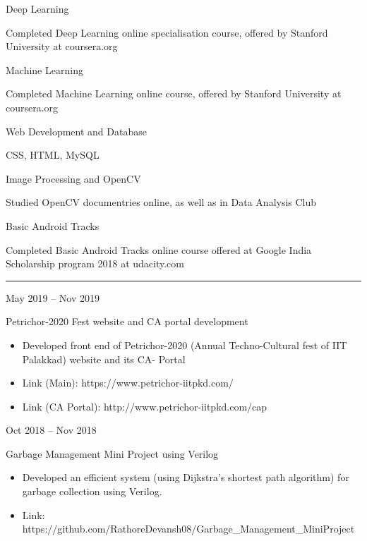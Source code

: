 \documentclass[a4paper,10pt]{article}
\newlength{\cvcolumngapwidth}
\newlength{\cvleftcolumnwidth}
\newlength{\cvrightcolumnwidth}
\newcommand{\cvsectionstyle}[1]{{\normalsize\cvsectionfont\textcolor{cvsectioncolor}{#1}}}
\newcommand{\cvtitlestyle}[1]{{\large\cvtitlefont\textcolor{cvtitlecolor}{#1}}}
\newcommand{\cvdurationstyle}[1]{{\small\cvdurationfont\textcolor{cvdurationcolor}{#1}}}
\newcommand{\cvheadingstyle}[1]{{\normalsize\cvheadingfont\textcolor{cvheadingcolor}{#1}}}
\newlength{\cvafteritemskipamount}
\newlength{\cvaftersectionskipamount}
\newlength{\cvbetweensectionandheadingextraskipamount}
\newlength{\cvaftertitleskipamount}
\newlength{\cvparskip}
\newcommand{\cvsection}[1]{
    \begin{minipage}[t]{\cvleftcolumnwidth}
        \raggedleft\cvsectionstyle{#1}
    \end{minipage}%
    \hspace{\cvcolumngapwidth}%
    \begin{minipage}[t]{\cvrightcolumnwidth}
        \textcolor{cvrulecolor}{\rule{\cvrightcolumnwidth}{0.3mm}}
    \end{minipage}

    \vspace{\cvaftersectionskipamount}
}
\newcommand{\cvitem}[2]{
    \begin{minipage}[t]{\cvleftcolumnwidth}
        \raggedleft #1
    \end{minipage}%
    \hspace{\cvcolumngapwidth}%
    \begin{minipage}[t]{\cvrightcolumnwidth}
        \setlength{\parskip}{\cvparskip} #2
    \end{minipage}

    \vspace{\cvafteritemskipamount}
}
\newcommand{\cvtitle}[1]{
    \cvtitlestyle{#1}

    \vspace{\cvaftertitleskipamount}
    \vspace{-\cvparskip}
}
\begin{document}
\cvitem{
    \cvheadingstyle{Deep Learning}
}{
   
    Completed Deep Learning online specialisation course, offered by Stanford University at coursera.org
    
}

\cvitem{
    \cvheadingstyle{Machine Learning}
}{
   
    Completed Machine Learning online course, offered by Stanford University at coursera.org
    
}

\cvitem{
    \cvheadingstyle{Web Development and Database}
}{
    
   CSS, HTML, MySQL
    
}

\cvitem{
    \cvheadingstyle{Image Processing and OpenCV}
}{
    
   Studied OpenCV documentries online, as well as in Data Analysis Club 
    
}

\cvitem{
    \cvheadingstyle{Basic Android Tracks}
}{
    
   Completed Basic Android Tracks online course offered at Google India Scholarship program 2018 at udacity.com
}

\cvsection{PROJECTS}

\vspace{\cvbetweensectionandheadingextraskipamount}

\cvitem{
    \cvdurationstyle{May 2019 -- Nov 2019}
}{
    \cvtitle{Petrichor-2020 Fest website and CA portal development  }

    \begin{itemize}[leftmargin=*]
        \item Developed front end of Petrichor-2020 (Annual Techno-Cultural fest of IIT Palakkad) website and its CA- Portal
        \item Link (Main): https://www.petrichor-iitpkd.com/
        \item Link (CA Portal): http://www.petrichor-iitpkd.com/cap
    \end{itemize}
}

\cvitem{
    \cvdurationstyle{Oct 2018 -- Nov 2018}
}{
    \cvtitle{Garbage Management Mini Project using Verilog}
    \begin{itemize}[leftmargin=*]
        \item Developed an efficient system (using Dijkstra's shortest path algorithm) for garbage collection
using Verilog.
        \item Link: https://github.com/RathoreDevansh08/Garbage\_Management\_MiniProject
        
    \end{itemize}
}
\end{document}
